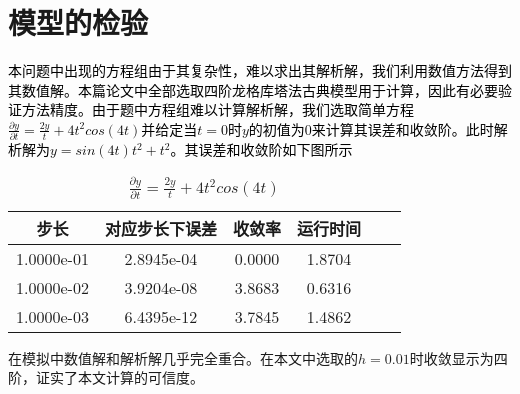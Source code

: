 \documentclass[withoutpreface,bwprint]{cumcmthesis}
\begin{document}
\section{模型的检验}
\textcolor{black}{本问题中出现的方程组由于其复杂性，难以求出其解析解，我们利用数值方法得到其数值解。本篇论文中全部选取四阶龙格库塔法\cite{ref1}古典模型用于计算，因此有必要验证方法精度。由于题中方程组难以计算解析解，我们选取简单方程$\frac{\partial y}{\partial t} = \frac{2y}{t}+4t^2cos(4t)$并给定当$t=0$时$y$的初值为0来计算其误差和收敛阶。此时解析解为$y=sin(4t)t^2+t^2$。其误差和收敛阶如下图所示}
\cite{ref1, ref4}
\begin{table}[htb!!]
	\centering
	\begin{tabular}{cccccc}
		\hline
步长 &    对应步长下误差  &   收敛率 &   运行时间& \\ \hline
1.0000e-01  & 2.8945e-04  & 0.0000  & 1.8704&\\
1.0000e-02  & 3.9204e-08  & 3.8683  & 0.6316&\\
1.0000e-03  & 6.4395e-12  & 3.7845  & 1.4862&\\ \hline
	\end{tabular}
	\caption{$\frac{\partial y}{\partial t} = \frac{2y}{t}+4t^2cos(4t)$}
\end{table}
在模拟中数值解和解析解几乎完全重合。在本文中选取的$h = 0.01$时收敛显示为四阶，证实了本文计算的可信度。

\newpage


\end{document}
